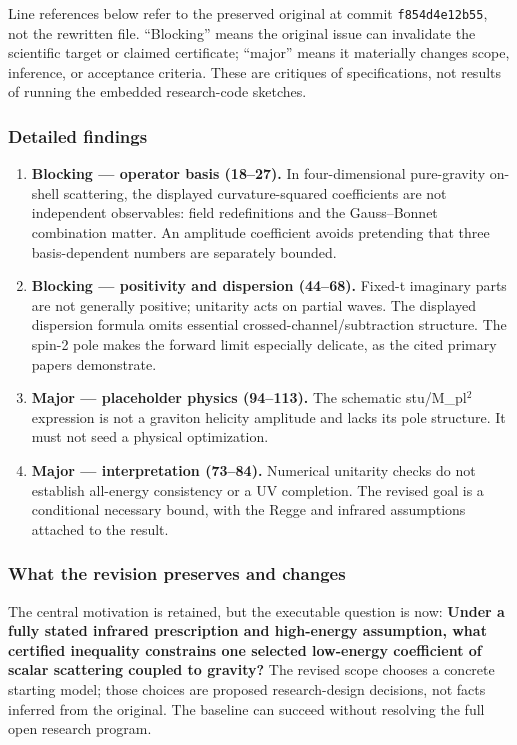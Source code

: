 \documentclass[
  11pt,
]{article}
\begin{document}
Line references below refer to the preserved original at commit
\texttt{f854d4e12b55}, not the rewritten file. ``Blocking'' means the
original issue can invalidate the scientific target or claimed
certificate; ``major'' means it materially changes scope, inference, or
acceptance criteria. These are critiques of specifications, not results
of running the embedded research-code sketches.

\subsubsection{Detailed findings}

\begin{enumerate}
\def\labelenumi{\arabic{enumi}.}
\item
  \textbf{Blocking --- operator basis (18--27).} In four-dimensional
  pure-gravity on-shell scattering, the displayed curvature-squared
  coefficients are not independent observables: field redefinitions and
  the Gauss--Bonnet combination matter. An amplitude coefficient avoids
  pretending that three basis-dependent numbers are separately bounded.
\item
  \textbf{Blocking --- positivity and dispersion (44--68).} Fixed-t
  imaginary parts are not generally positive; unitarity acts on partial
  waves. The displayed dispersion formula omits essential
  crossed-channel/subtraction structure. The spin-2 pole makes the
  forward limit especially delicate, as the cited primary papers
  demonstrate.
\item
  \textbf{Major --- placeholder physics (94--113).} The schematic
  stu/M\_pl\ensuremath{{}^{2}} expression is not a graviton helicity
  amplitude and lacks its pole structure. It must not seed a physical
  optimization.
\item
  \textbf{Major --- interpretation (73--84).} Numerical unitarity checks
  do not establish all-energy consistency or a UV completion. The
  revised goal is a conditional necessary bound, with the Regge and
  infrared assumptions attached to the result.
\end{enumerate}

\subsubsection{What the revision preserves and changes}

The central motivation is retained, but the executable question is now:
\textbf{Under a fully stated infrared prescription and high-energy
assumption, what certified inequality constrains one selected low-energy
coefficient of scalar scattering coupled to gravity?} The revised scope
chooses a concrete starting model; those choices are proposed
research-design decisions, not facts inferred from the original. The
baseline can succeed without resolving the full open research program.
\end{document}
